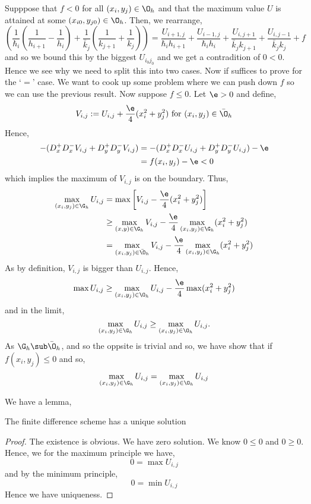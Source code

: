 \noindent
Supppose that $f < 0$ for all $(x_i, y_j) \in \O_h$ and that the maximum value $U$ is attained at some $(x_{i0}, y_{j0}) \in \O_h$. Then, we rearrange,
$$ \left( \frac{1}{\hbar_i} \left( \frac{1}{h_{i+1}} - \frac{1}{h_i} \right) + \frac{1}{\bar k_j} \left( \frac{1}{k_{j+1}} + \frac{1}{k_j} \right) \right) = \frac{U_{i+1,j}}{\hbar_i h_{i+1}} + \frac{U_{i-1, j}}{\hbar_i h_i} + \frac{U_{i, j+1}}{\bar k_j k_{j+1}} + \frac{U_{i,j-1}}{\bar k_j k_j} + f$$
and so we bound this by the biggest $U_{i_0 j_0}$ and we get a contradition of $0 < 0$. Hence we see why we need to split this into two cases. Now if suffices to prove for the `$=$' case. We want to cook up some problem where we can push down $f$ so we can use the previous result. Now suppose $f \le 0$. Let $\e > 0$ and define,
$$ V_{i,j} := U_{i,j} + \frac{\e}{4} (x_i^2 + y_j^2) \text{ for } (x_i, y_j) \in \bar \O_h $$
Hence,
\begin{align*}
  -(D_x^+D_x^- V_{i,j} + D_y^+D_y^- V_{i,j}) &= - (D_x^+D_x^-U_{i,j} + D_y^+D_y^- U_{i,j}) - \e \\
  &= f(x_i, y_j) - \e < 0
\end{align*}
which implies the maximum of $V_{i,j}$ is on the boundary. Thus,
\begin{align*}
  \max_{(x_i, y_j) \in \G_h} U_{i,j} &= \max \left[ V_{i,j} - \frac{\e}{4}(x_i^2 + y_j^2) \right]\\
  &\ge \max_{(x,y) \in \G_h} V_{i,j} - \frac{\e}{4}\max_{(x_i, y_j) \in \G_h} (x_i^2 + y_j^2) \\
  &= \max_{(x_i, y_j) \in \bar \O_h} V_{i,j} - \frac{\e}{4} \max_{(x_i, y_j) \in \G_h} (x_i^2 + y_j^2)
\end{align*}
As by definition, $V_{i,j}$ is bigger than $U_{i,j}$. Hence,
$$ \max U_{i,j} \ge \max_{(x_i, y_j) \in \O_h} U_{i,j} - \frac{\e}{4}\max (x_i^2 + y_j^2) $$
and in the limit,
$$ \max_{(x_i, y_j) \in \G_h} U_{i,j} \ge \max_{(x_i, y_j) \in \O_h} U_{i,j}. $$
As $\G_h \sub \bar \O_h$, and so the oppsite is trivial and so, we have show that if $f(x_i, y_j) \le 0$ and so,
$$ \max_{(x_i, y_j) \in \G_h} U_{i,j} = \max_{(x_i, y_j) \in \O_h} U_{i,j} $$

\noindent
We have a lemma,
\begin{nlemma}
  The finite difference scheme has a unique solution
\end{nlemma}
\begin{proof}
  The existence is obvious. We have zero solution. We know $0 \le 0$ and $0 \ge 0$. Hence, we for the maximum principle we have,
  $$ 0 = \max U_{i,j} $$
  and by the minimum principle,
  $$ 0 = \min U_{i,j} $$
  Hence we have uniqueness.
\end{proof}

